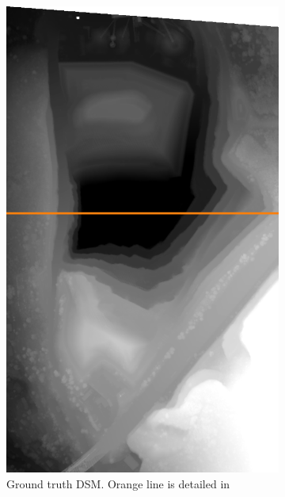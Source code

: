 \begin{figure}
    \begin{subfigure}[t]{0.33\linewidth}
        \flushleft
        \includegraphics[width=\linewidth]{Images/Chap_6/Carriere_gt_Monaco.png}
        \caption{Ground truth DSM. Orange line is detailed in }
        \label{fig:Carriere_gt}
    \end{subfigure}\hfill
    \begin{subfigure}[t]{0.33\linewidth}
        \centering

\end{subfigure}
\end{figure}
